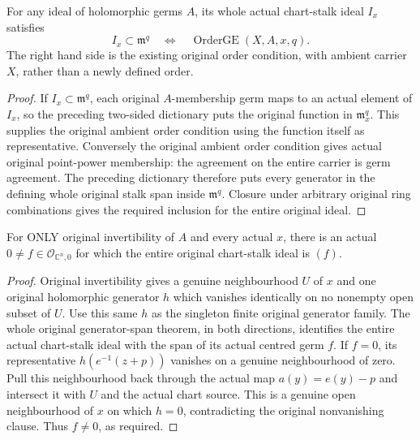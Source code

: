 \begin{theorem}
\label{hir:actual-whole-chart-stalk-original-order-dictionary}
\leanok
{}
For any ideal of holomorphic germs $A$, its whole actual chart-stalk ideal
$I_x$ satisfies
\[
 I_x\subset\mathfrak m^q\quad\Longleftrightarrow\quad
 \operatorname{OrderGE}(X,A,x,q).
\]
The right hand side is the existing original order condition, with ambient
carrier $X$, rather than a newly defined order.
\end{theorem}
\begin{proof}
If $I_x\subset\mathfrak m^q$, each original $A$-membership germ maps to
an actual element of $I_x$, so the preceding two-sided dictionary puts
the original function in $\mathfrak m_x^q$. This supplies the original
ambient order condition using the function itself as representative.
Conversely the original ambient order condition gives actual original
point-power membership: the agreement on the entire carrier is germ
agreement. The preceding dictionary therefore puts every generator in
the defining whole original stalk span inside $\mathfrak m^q$. Closure
under arbitrary original ring combinations gives the required inclusion
for the entire original ideal.
\end{proof}

\begin{theorem}
\label{hir:actual-invertible-nonzero-principal-whole-stalk}
\leanok
{}
For ONLY original invertibility of $A$ and every actual $x$, there is an
actual $0\ne f\in\mathcal O_{\mathbb C^n,0}$ for which the entire
original chart-stalk ideal is $(f)$.
\end{theorem}
\begin{proof}
Original invertibility gives a genuine neighbourhood $U$ of $x$ and one
original holomorphic generator $h$ which vanishes identically on no
nonempty open subset of $U$. Use this same $h$ as the singleton finite
original generator family. The whole original generator-span theorem,
in both directions, identifies the entire actual chart-stalk ideal with
the span of its actual centred germ $f$. If $f=0$, its representative
$h(e^{-1}(z+p))$ vanishes on a genuine neighbourhood of zero. Pull this
neighbourhood back through the actual map $a(y)=e(y)-p$ and intersect it
with $U$ and the actual chart source. This is a genuine open neighbourhood
of $x$ on which $h=0$, contradicting the original nonvanishing clause.
Thus $f\ne0$, as required.
\end{proof}

